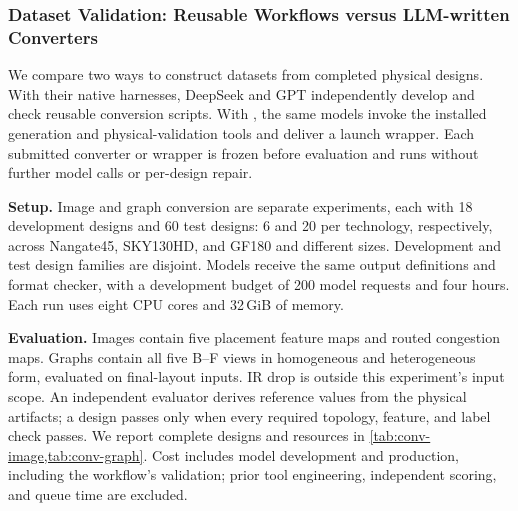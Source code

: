 
\subsubsection{Dataset Validation: Reusable Workflows versus LLM-written Converters}
\label{sec:exp4-validation}
We compare two ways to construct datasets from completed physical designs. With their native harnesses,
DeepSeek and GPT independently develop and check reusable conversion scripts. With \R, the same models invoke
the installed generation and physical-validation tools and deliver a launch wrapper. Each submitted converter
or wrapper is frozen before evaluation and runs without further model calls or per-design repair.

\textbf{Setup.} Image and graph conversion are separate experiments, each with 18 development designs and
60 test designs: 6 and 20 per technology, respectively, across Nangate45, SKY130HD, and GF180 and different sizes.
Development and test design families are disjoint. Models receive the same output definitions and format checker,
with a development budget of 200 model requests and four hours. Each run uses eight CPU cores and 32\,GiB of memory.

\textbf{Evaluation.} Images contain five placement feature maps and routed congestion maps. Graphs contain all
five B--F views in homogeneous and heterogeneous form, evaluated on final-layout inputs. IR drop is outside this
experiment's input scope. An independent evaluator derives reference values from the physical artifacts;
a design passes only when every required topology, feature, and label check passes. We report complete designs
and resources in \cref{tab:conv-image,tab:conv-graph}. Cost includes model development and production, including
the workflow's validation; prior \R tool engineering, independent scoring, and queue time are excluded.

